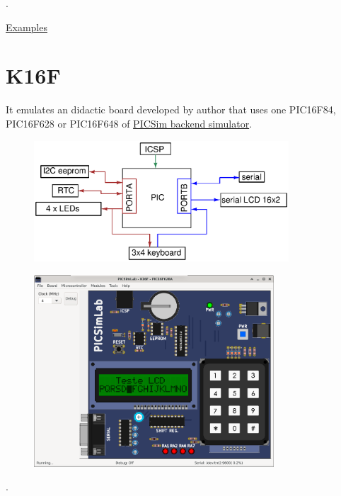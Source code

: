 .\vspace{0.5cm}

\href{https://lcgamboa.github.io/picsimlab_examples/board_Franzininho_DIY.html}{Examples}

\section{K16F}

It emulates an didactic board developed by author that uses one PIC16F84, PIC16F628 or PIC16F648 of
\hyperlink{def:PICSim}{PICSim backend simulator}.

\begin{figure}[H]
\center
\includegraphics[width=0.85\textwidth]{img/blocks_p2.eps} 
\end{figure} 


\begin{figure}[H]
\center
\includegraphics[width=0.8\textwidth]{img/picsimlab2.png} 
\end{figure} 

.\vspace{0.5cm}


